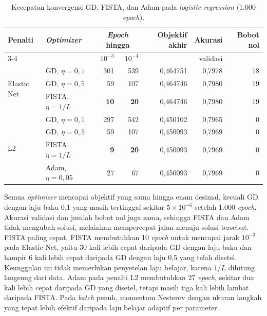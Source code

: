 \begin{table}[htbp]
    \centering
    \small
    \begin{tabular}{@{}l l r r r r r@{}}
        \toprule
        Penalti & \textit{Optimizer} & \multicolumn{2}{c}{\textit{Epoch} hingga} & Objektif akhir & Akurasi & Bobot nol \\
        \cmidrule(lr){3-4}
         & & $10^{-3}$ & $10^{-4}$ & & validasi & \\
        \midrule
        \multirow{3}{*}{Elastic Net} & GD, $\eta=0{,}1$ & 301 & 539 & 0,464751 & 0,7978 & 18 \\
         & GD, $\eta=0{,}5$ & 59 & 107 & 0,464746 & 0,7980 & 19 \\
         & FISTA, $\eta=1/L$ & \textbf{10} & \textbf{20} & 0,464746 & 0,7980 & 19 \\
        \midrule
        \multirow{4}{*}{L2} & GD, $\eta=0{,}1$ & 297 & 542 & 0,450102 & 0,7965 & 0 \\
         & GD, $\eta=0{,}5$ & 59 & 107 & 0,450093 & 0,7969 & 0 \\
         & FISTA, $\eta=1/L$ & \textbf{9} & \textbf{20} & 0,450093 & 0,7969 & 0 \\
         & Adam, $\eta=0{,}05$ & 27 & 67 & 0,450093 & 0,7969 & 0 \\
        \bottomrule
    \end{tabular}
    \caption{Kecepatan konvergensi GD, FISTA, dan Adam pada \textit{logistic regression} (1.000 \textit{epoch}).}
    \label{tab:optim-lr}
\end{table}

Semua \textit{optimizer} mencapai objektif yang sama hingga enam desimal, kecuali GD dengan laju baku 0,1 yang masih tertinggal sekitar $5\times10^{-6}$ setelah 1.000 \textit{epoch}. Akurasi validasi dan jumlah bobot nol juga sama, sehingga FISTA dan Adam tidak mengubah solusi, melainkan mempercepat jalan menuju solusi tersebut. FISTA paling cepat. FISTA membutuhkan 10 \textit{epoch} untuk mencapai jarak $10^{-3}$ pada Elastic Net, yaitu 30 kali lebih cepat daripada GD dengan laju baku dan hampir 6 kali lebih cepat daripada GD dengan laju 0,5 yang telah disetel. Keunggulan ini tidak memerlukan penyetelan laju belajar, karena $1/L$ dihitung langsung dari data. Adam pada penalti L2 membutuhkan 27 \textit{epoch}, sekitar dua kali lebih cepat daripada GD yang disetel, tetapi masih tiga kali lebih lambat daripada FISTA. Pada \textit{batch} penuh, momentum Nesterov dengan ukuran langkah yang tepat lebih efektif daripada laju belajar adaptif per parameter.

